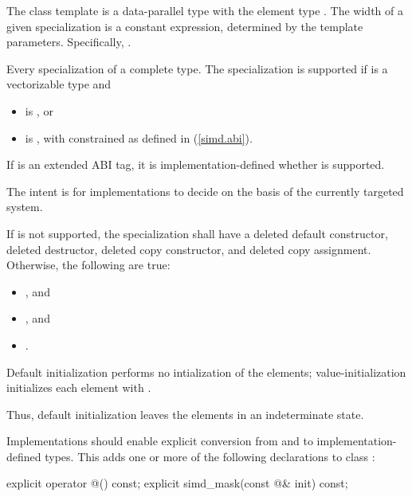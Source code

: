 \pnum
The class template  is a data-parallel type with the element type . The width of a given  specialization is a constant expression, determined by the template parameters. Specifically, .

\pnum
Every specialization of   a complete type. The specialization  is supported if  is a vectorizable type and
\begin{itemize}
  \item {} is , or
  \item {} is , with  constrained as defined in (\ref{simd.abi}).
\end{itemize}

If  is an extended ABI tag, it is implementation-defined whether  is supported. \begin{note}The intent is for implementations to decide on the basis of the currently targeted system.\end{note}

If  is not supported, the specialization shall have a deleted default constructor, deleted destructor, deleted copy constructor, and deleted copy assignment.
Otherwise, the following are true:
\begin{itemize}
  \item {}, and
  \item {}, and
  \item {}.
\end{itemize}

\pnum
Default initialization performs no intialization of the elements; value-initialization initializes each element with . \begin{note}Thus, default initialization leaves the elements in an indeterminate state.\end{note}

\pnum
Implementations should enable explicit conversion from and to implementation-defined types. This adds one or more of the following declarations to class :

\begin{codeblock}
explicit operator @\impdef@() const;
explicit simd_mask(const @\impdef@& init) const;
\end{codeblock}

